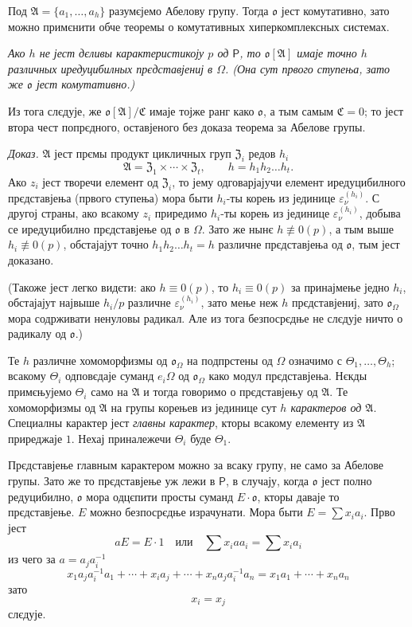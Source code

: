 \documentclass[11pt]{article}
\begin{document}
Под \(\mathfrak A=\{a_1,\ldots,a_h\}\) разумєјемо Абелову групу. Тогда \(\mathfrak o\) јест комутативно, зато можно примєнити обче теоремы о комутативных хиперкомплексных системах.

\emph{Ако \(h\) не јест дєливы карактеристикоју \(p\) од \(\mathsf P\), то \(\mathfrak o[\mathfrak A]\) имаје точно \(h\) различных иредуцибилных прєдставјениј в \(\Omega\). (Она сут првого ступења, зато же \(\mathfrak o\) јест комутативно.)}

Из тога слєдује, же \(\mathfrak o[\mathfrak A]/\mathfrak C\) имаје тојже ранг како \(\mathfrak o\), а тым самым \(\mathfrak C=0\); то јест втора чест попрєдного, оставјеного без доказа теорема за Абелове групы.

\emph{Доказ.} \(\mathfrak A\) јест прємы продукт цикличных груп \(\mathfrak Z_i\) редов \(h_i\)
\[
\mathfrak A=\mathfrak Z_1\times\cdots\times\mathfrak Z_t,\qquad
h=h_1h_2\ldots h_t .
\]
Ако \(z_i\) јест творечи елемент од \(\mathfrak Z_i\), то јему одговарјајучи елемент иредуцибилного прєдставјења (првого ступења) мора быти \(h_i\)-ты корењ из јединице \(\varepsilon_\nu^{(h_i)}\). С другој страны, ако всакому \(z_i\) приредимо \(h_i\)-ты корењ из јединице \(\varepsilon_\nu^{(h_i)}\), добыва се иредуцибилно прєдставјење од \(\mathfrak o\) в \(\Omega\). Зато же нынє \(h\not\equiv0(p)\), а тым выше \(h_i\not\equiv0(p)\), обстајајут точно \(h_1h_2\ldots h_t=h\) различне прєдставјења од \(\mathfrak o\), тым јест доказано.

(Такоже јест легко видєти: ако \(h\equiv0(p)\), то \(h_i\equiv0(p)\) за принајмење једно \(h_i\), обстајајут највыше \(h_i/p\) различне \(\varepsilon_\nu^{(h_i)}\), зато мење неж \(h\) прєдставјениј, зато \(\mathfrak o_\Omega\) мора содрживати ненуловы радикал. Але из тога безпосрєдње не слєдује ничто о радикалу од \(\mathfrak o\).)

Те \(h\) различне хомоморфизмы од \(\mathfrak o_\Omega\) на подпрстены од \(\Omega\) означимо с \(\Theta_1,\ldots,\Theta_h\); всакому \(\Theta_i\) одповєдаје суманд \(e_i\Omega\) од \(\mathfrak o_\Omega\) како модул прєдставјења. Нєкды примєњујемо \(\Theta_i\) само на \(\mathfrak A\) и тогда говоримо о прєдставјењу од \(\mathfrak A\). Те хомоморфизмы од \(\mathfrak A\) на групы корењев из јединице сут \emph{\(h\) карактеров од \(\mathfrak A\)}. Специалны карактер јест \emph{главны карактер}, кторы всакому елементу из \(\mathfrak A\) приреджаје \(1\). Нехај приналежечи \(\Theta_i\) буде \(\Theta_1\).

Прєдставјење главным карактером можно за всаку групу, не само за Абелове групы. Зато же то прєдставјење уж лежи в \(\mathsf P\), в случају, когда \(\mathfrak o\) јест полно редуцибилно, \(\mathfrak o\) мора одцєпити просты суманд \(E\cdot\mathfrak o\), кторы даваје то прєдставјење. \(E\) можно безпосрєдње израчунати. Мора быти \(E=\sum x_i a_i\). Прво јест
\[
aE=E\cdot 1\quad\text{или}\quad \sum x_i a a_i=\sum x_i a_i
\]
из чего за \(a=a_j a_i^{-1}\)
\[
x_1a_ja_i^{-1}a_1+\cdots+x_i a_j+\cdots+x_na_ja_i^{-1}a_n
=x_1a_1+\cdots+x_na_n
\]
зато
\[
x_i=x_j
\]
слєдује.
\end{document}
